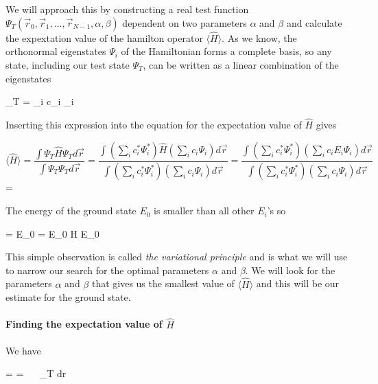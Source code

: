 We will approach this by constructing a real test function $\Psi_T(\vec r_0, \vec r_1, ... , \vec r_{N-1}, \alpha,\beta )$ dependent on two parameters $\alpha$ and $\beta$ and calculate the expextation value of the hamilton operator $\langle \hat{H} \rangle $. 
As we know, the orthonormal eigenstates $\Psi_i$ of the Hamiltonian forms a complete basis, so any state, including our test state $\Psi_T$, can be written as a linear combination of the eigenstates 

\eqs
\Psi_T = \sum_i c_i \Psi_i
\eqf

Inserting this expression into the equation for the expectation value of $\hat{H}$ gives

\[
\langle \hat{H} \rangle = \frac{\int \Psi_T \hat{H} \Psi_T d\vec r}{ \int \Psi_T \Psi_T d\vec r} 
= \frac{\int \left ( \sum_i c_i^* \Psi_i^* \right ) \hat{H} \left ( \sum_i c_i \Psi_i \right ) d\vec r}{ \int \left ( \sum_i c_i^* \Psi_i^*  \right ) \left ( \sum_i c_i \Psi_i \right ) d\vec r}
=
\frac{\int \left ( \sum_i c_i^* \Psi_i^* \right ) \left ( \sum_i c_i  E_i \Psi_i \right ) d\vec r}{ \int \left ( \sum_i c_i^* \Psi_i^* \right ) \left ( \sum_i c_i \Psi_i \right ) d\vec r}
\]
\eqs
=
\eqf

The energy of the ground state $E_0$ is smaller than all other $E_i$'s so 

\eqs
{} \geq {} = E_0  = E_0
\eqf
\eqs
\langle H \rangle \geq E_0
\eqf

This simple observation is called \textit{the variational principle} and is what we will use to narrow our search for the optimal parameters $\alpha$ and $\beta$.
We will look for the parameters $\alpha$ and $\beta$ that gives us the smallest value of $\langle \hat{H} \rangle$ and this will be our estimate for the ground state.







\paragraph{Finding the expectation value of $\hat{H}$}

We have

\eqs
\langle {} \rangle =  
=
\int ~~   \Psi_T d\vec r
\eqf

